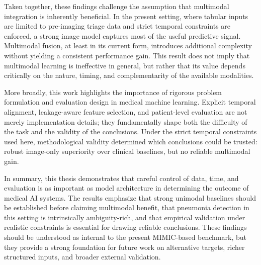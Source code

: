 Taken together, these findings challenge the assumption that multimodal integration is inherently beneficial. In the present setting, where tabular inputs are limited to pre-imaging triage data and strict temporal constraints are enforced, a strong image model captures most of the useful predictive signal. Multimodal fusion, at least in its current form, introduces additional complexity without yielding a consistent performance gain. This result does not imply that multimodal learning is ineffective in general, but rather that its value depends critically on the nature, timing, and complementarity of the available modalities.

More broadly, this work highlights the importance of rigorous problem formulation and evaluation design in medical machine learning. Explicit temporal alignment, leakage-aware feature selection, and patient-level evaluation are not merely implementation details; they fundamentally shape both the difficulty of the task and the validity of the conclusions. Under the strict temporal constraints used here, methodological validity determined which conclusions could be trusted: robust image-only superiority over clinical baselines, but no reliable multimodal gain.

In summary, this thesis demonstrates that careful control of data, time, and evaluation is as important as model architecture in determining the outcome of medical AI systems. The results emphasize that strong unimodal baselines should be established before claiming multimodal benefit, that pneumonia detection in this setting is intrinsically ambiguity-rich, and that empirical validation under realistic constraints is essential for drawing reliable conclusions. These findings should be understood as internal to the present MIMIC-based benchmark, but they provide a strong foundation for future work on alternative targets, richer structured inputs, and broader external validation.